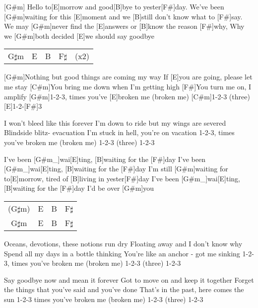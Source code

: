

\begin{guitar}
	[G#m] Hello to[E]morrow and good[B]bye to yester[F#]day.
	We've been [G#m]waiting for this [E]moment and we [B]still don't know what to [F#]say.
	We may [G#m]never find the [E]answers or [B]know the reason [F#]why,
	Why we [G#m]both decided [E]we should say goodbye
	
	{\footnotesize\begin{tabular}{l|l|l|l l}
			G$\sharp$m & E & B & F$\sharp$ & (x2)
	\end{tabular}}

	[G#m]Nothing but good things are coming my way
	If [E]you are going, please let me stay
	[C#m]You bring me down when I'm getting high
	[F#]You turn me on, I amplify
	[G#m]1-2-3, times you've [E]broken me (broken me)
	[C#m]1-2-3 (three) [E]1-2-[F#]3
	
	I won't bleed like this forever
	I'm down to ride but my wings are severed
	Blindside blitz- evacuation
	I'm stuck in hell, you're on vacation
	1-2-3, times you've broken me (broken me)
	1-2-3 (three) 1-2-3
	
	I've been [G#m_]{wai}[E]ting, [B]waiting for the [F#]day
	I've been [G#m_]{wai}[E]ting, [B]waiting for the [F#]day
	I'm still [G#m]waiting for to[E]morrow, tired of [B]living in yester[F#]day
	I've been [G#m_]{wai}[E]ting, [B]waiting for the [F#]day I'd be over [G#m]you
	
	{\footnotesize\begin{tabular}{c|l|l|l}
			(G$\sharp$m) & E & B & F$\sharp$ \\
			G$\sharp$m & E & B & F$\sharp$ 
	\end{tabular}}
	
	\pagebreak
	Oceans, devotions, these notions run dry
	Floating away and I don't know why
	Spend all my days in a bottle thinking
	You're like an anchor - got me sinking
	1-2-3, times you've broken me (broken me)
	1-2-3 (three) 1-2-3
	
	Say goodbye now and mean it forever
	Got to move on and keep it together
	Forget the things that you've said and you've done
	That's in the past, here comes the sun
	1-2-3 times you've broken me (broken me)
	1-2-3 (three) 1-2-3
	

\end{guitar}
